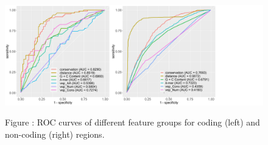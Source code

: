 \documentclass[a4paper,nohyper,nobib,openany,justified]{tufte-book}
\begin{document}
\begin{fullwidth}
\begin{figure}[tp]
  \includegraphics[width=\linewidth]{ROC_featureEval.pdf}%

  \smallskip\noindent\small Figure \thefigure:
   ROC curves of different feature groups for coding (left) and non-coding (right) regions.
  \label{fig:ROC_fea}%
\end{figure}



\end{fullwidth}
\end{document}
